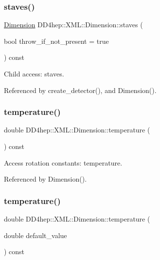 \subsubsection{\texorpdfstring{staves()}{staves()}}
{\footnotesize\ttfamily \hyperlink{struct_d_d4hep_1_1_x_m_l_1_1_dimension}{Dimension} D\+D4hep\+::\+X\+M\+L\+::\+Dimension\+::staves (\begin{DoxyParamCaption}\item[{bool}]{throw\+\_\+if\+\_\+not\+\_\+present = {\ttfamily true} }\end{DoxyParamCaption}) const}



Child access\+: staves. 



Referenced by create\+\_\+detector(), and Dimension().

\hypertarget{struct_d_d4hep_1_1_x_m_l_1_1_dimension_aed42e5f342465fae8aa5ff5b968b1aa7}{}\label{struct_d_d4hep_1_1_x_m_l_1_1_dimension_aed42e5f342465fae8aa5ff5b968b1aa7} 
\subsubsection{\texorpdfstring{temperature()}{temperature()}\hspace{0.1cm}{\footnotesize\ttfamily [1/2]}}
{\footnotesize\ttfamily double D\+D4hep\+::\+X\+M\+L\+::\+Dimension\+::temperature (\begin{DoxyParamCaption}{ }\end{DoxyParamCaption}) const}



Access rotation constants\+: temperature. 



Referenced by Dimension().

\hypertarget{struct_d_d4hep_1_1_x_m_l_1_1_dimension_a2a92c1e31e74a84db538f43561ab6f64}{}\label{struct_d_d4hep_1_1_x_m_l_1_1_dimension_a2a92c1e31e74a84db538f43561ab6f64} 
\subsubsection{\texorpdfstring{temperature()}{temperature()}\hspace{0.1cm}{\footnotesize\ttfamily [2/2]}}
{\footnotesize\ttfamily double D\+D4hep\+::\+X\+M\+L\+::\+Dimension\+::temperature (\begin{DoxyParamCaption}\item[{double}]{default\+\_\+value }\end{DoxyParamCaption}) const}



